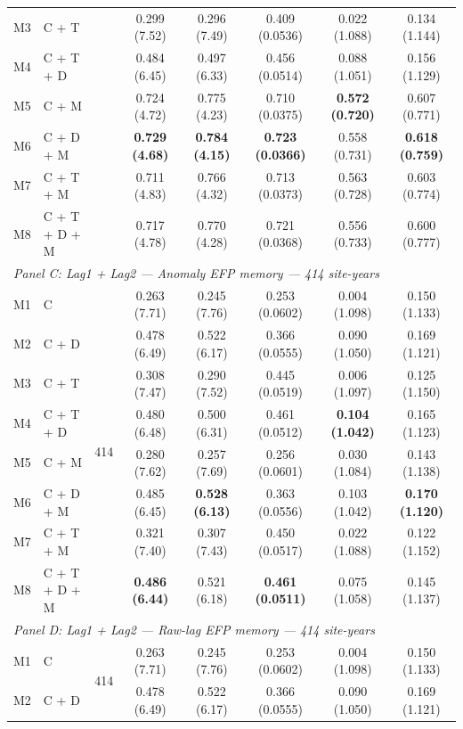 \begin{table}[htbp]
\begin{tabular}{llcccccc}
M3 & C + T &  & 0.299 (7.52) & 0.296 (7.49) & 0.409 (0.0536) & 0.022 (1.088) & 0.134 (1.144) \\
M4 & C + T + D &  & 0.484 (6.45) & 0.497 (6.33) & 0.456 (0.0514) & 0.088 (1.051) & 0.156 (1.129) \\
M5 & C + M &  & 0.724 (4.72) & 0.775 (4.23) & 0.710 (0.0375) & \textbf{0.572 (0.720)} & 0.607 (0.771) \\
M6 & C + D + M &  & \textbf{0.729 (4.68)} & \textbf{0.784 (4.15)} & \textbf{0.723 (0.0366)} & 0.558 (0.731) & \textbf{0.618 (0.759)} \\
M7 & C + T + M &  & 0.711 (4.83) & 0.766 (4.32) & 0.713 (0.0373) & 0.563 (0.728) & 0.603 (0.774) \\
M8 & C + T + D + M &  & 0.717 (4.78) & 0.770 (4.28) & 0.721 (0.0368) & 0.556 (0.733) & 0.600 (0.777) \\
\midrule
\multicolumn{8}{l}{\textit{Panel C: Lag1 + Lag2 --- Anomaly EFP memory --- 414 site-years}} \\
\midrule
M1 & C & \multirow{8}{*}{414} & 0.263 (7.71) & 0.245 (7.76) & 0.253 (0.0602) & 0.004 (1.098) & 0.150 (1.133) \\
M2 & C + D &  & 0.478 (6.49) & 0.522 (6.17) & 0.366 (0.0555) & 0.090 (1.050) & 0.169 (1.121) \\
M3 & C + T &  & 0.308 (7.47) & 0.290 (7.52) & 0.445 (0.0519) & 0.006 (1.097) & 0.125 (1.150) \\
M4 & C + T + D &  & 0.480 (6.48) & 0.500 (6.31) & 0.461 (0.0512) & \textbf{0.104 (1.042)} & 0.165 (1.123) \\
M5 & C + M &  & 0.280 (7.62) & 0.257 (7.69) & 0.256 (0.0601) & 0.030 (1.084) & 0.143 (1.138) \\
M6 & C + D + M &  & 0.485 (6.45) & \textbf{0.528 (6.13)} & 0.363 (0.0556) & 0.103 (1.042) & \textbf{0.170 (1.120)} \\
M7 & C + T + M &  & 0.321 (7.40) & 0.307 (7.43) & 0.450 (0.0517) & 0.022 (1.088) & 0.122 (1.152) \\
M8 & C + T + D + M &  & \textbf{0.486 (6.44)} & 0.521 (6.18) & \textbf{0.461 (0.0511)} & 0.075 (1.058) & 0.145 (1.137) \\
\midrule
\multicolumn{8}{l}{\textit{Panel D: Lag1 + Lag2 --- Raw-lag EFP memory --- 414 site-years}} \\
\midrule
M1 & C & \multirow{8}{*}{414} & 0.263 (7.71) & 0.245 (7.76) & 0.253 (0.0602) & 0.004 (1.098) & 0.150 (1.133) \\
M2 & C + D &  & 0.478 (6.49) & 0.522 (6.17) & 0.366 (0.0555) & 0.090 (1.050) & 0.169 (1.121) \\

\end{tabular}
\end{table}
